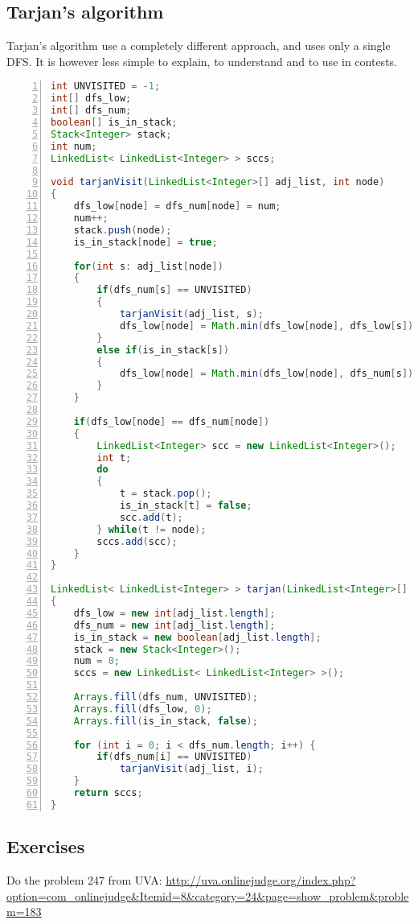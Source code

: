 \subsection{Tarjan's algorithm}
Tarjan's algorithm use a completely different approach, and uses only a single DFS.
It is however less simple to explain, to understand and to use in contests.

\begin{lstlisting}[label=code-scc2,caption=Toposort+DFS, language=Java, tabsize=2, breaklines=true, numbers=left]
int UNVISITED = -1;
int[] dfs_low;
int[] dfs_num;
boolean[] is_in_stack;
Stack<Integer> stack;
int num;
LinkedList< LinkedList<Integer> > sccs;
	
void tarjanVisit(LinkedList<Integer>[] adj_list, int node)
{
	dfs_low[node] = dfs_num[node] = num;
	num++;
	stack.push(node);
	is_in_stack[node] = true;

	for(int s: adj_list[node])
	{
		if(dfs_num[s] == UNVISITED)
		{
			tarjanVisit(adj_list, s);
			dfs_low[node] = Math.min(dfs_low[node], dfs_low[s]);
		}
		else if(is_in_stack[s])
		{
			dfs_low[node] = Math.min(dfs_low[node], dfs_num[s]);
		}
	}
		
	if(dfs_low[node] == dfs_num[node])
	{
		LinkedList<Integer> scc = new LinkedList<Integer>();
		int t;
		do
		{
			t = stack.pop();
			is_in_stack[t] = false;
			scc.add(t);
		} while(t != node);
		sccs.add(scc);
	}
}
	
LinkedList< LinkedList<Integer> > tarjan(LinkedList<Integer>[] adj_list)
{
	dfs_low = new int[adj_list.length];
	dfs_num = new int[adj_list.length];
	is_in_stack = new boolean[adj_list.length];
	stack = new Stack<Integer>();
	num = 0;
	sccs = new LinkedList< LinkedList<Integer> >();
	
	Arrays.fill(dfs_num, UNVISITED);
	Arrays.fill(dfs_low, 0);
	Arrays.fill(is_in_stack, false);
	
	for (int i = 0; i < dfs_num.length; i++) {
		if(dfs_num[i] == UNVISITED)
			tarjanVisit(adj_list, i);
	}
	return sccs;
}
\end{lstlisting}

\subsection{Exercises}

Do the problem 247 from UVA: \url{http://uva.onlinejudge.org/index.php?option=com_onlinejudge&Itemid=8&category=24&page=show_problem&problem=183}